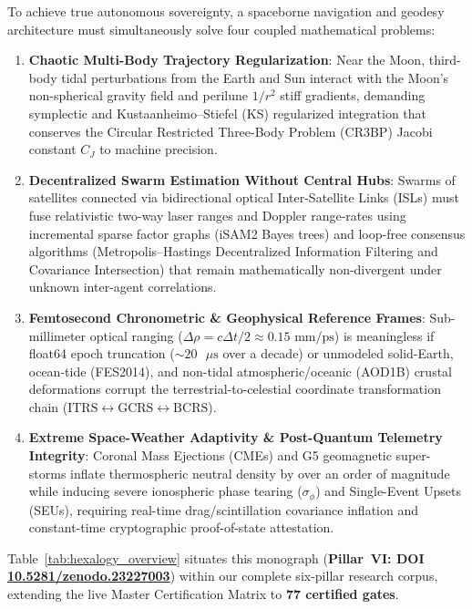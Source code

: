 \documentclass[11pt,a4paper,reqno]{article}
\def\texttt#1{#1}%
\newcommand{\zenodo}[1]{\href{https://doi.org/10.5281/zenodo.#1}{\texttt{10.5281/\allowbreak zenodo.#1}}}
\theoremstyle{plain}
\theoremstyle{definition}
\theoremstyle{remark}
\numberwithin{equation}{section}
\begin{document}
To achieve true autonomous sovereignty, a spaceborne navigation and geodesy architecture must simultaneously solve four coupled mathematical problems:
\begin{enumerate}[leftmargin=1.8em,itemsep=2pt]
  \item \textbf{Chaotic Multi-Body Trajectory Regularization}: Near the Moon, third-body tidal perturbations from the Earth and Sun interact with the Moon's non-spherical gravity field and perilune $1/r^2$ stiff gradients, demanding symplectic and Kustaanheimo--Stiefel (KS) regularized integration that conserves the Circular Restricted Three-Body Problem (CR3BP) Jacobi constant $C_J$ to machine precision.
  \item \textbf{Decentralized Swarm Estimation Without Central Hubs}: Swarms of satellites connected via bidirectional optical Inter-Satellite Links (ISLs) must fuse relativistic two-way laser ranges and Doppler range-rates using incremental sparse factor graphs (iSAM2 Bayes trees) and loop-free consensus algorithms (Metropolis--Hastings Decentralized Information Filtering and Covariance Intersection) that remain mathematically non-divergent under unknown inter-agent correlations.
  \item \textbf{Femtosecond Chronometric \& Geophysical Reference Frames}: Sub-millimeter optical ranging ($\Delta\rho = c\Delta t / 2 \approx 0.15\text{ mm/ps}$) is meaningless if float64 epoch truncation ($\sim 20\text{ }\mu\text{s}$ over a decade) or unmodeled solid-Earth, ocean-tide (FES2014), and non-tidal atmospheric/oceanic (AOD1B) crustal deformations corrupt the terrestrial-to-celestial coordinate transformation chain ($\text{ITRS} \leftrightarrow \text{GCRS} \leftrightarrow \text{BCRS}$).
  \item \textbf{Extreme Space-Weather Adaptivity \& Post-Quantum Telemetry Integrity}: Coronal Mass Ejections (CMEs) and G5 geomagnetic super-storms inflate thermospheric neutral density by over an order of magnitude while inducing severe ionospheric phase tearing ($\sigma_\phi$) and Single-Event Upsets (SEUs), requiring real-time drag/scintillation covariance inflation and constant-time cryptographic proof-of-state attestation.
\end{enumerate}

Table~\ref{tab:hexalogy_overview} situates this monograph (\textbf{Pillar~VI: DOI \zenodo{23227003}}) within our complete six-pillar research corpus, extending the live Master Certification Matrix to \textbf{77 certified gates}.
\end{document}
